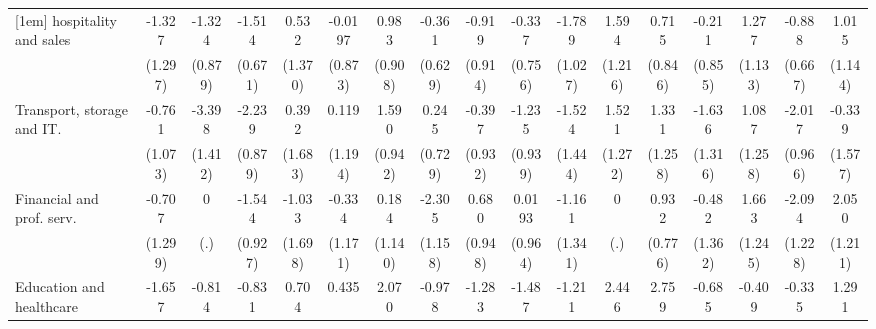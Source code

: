 {\begin{tabular}{l*{16}{c}}
[1em]
hospitality and sales&      -1.327         &      -1.324         &      -1.514\sym{*}  &       0.532         &     -0.0197         &       0.983         &      -0.361         &      -0.919         &      -0.337         &      -1.789         &       1.594         &       0.715         &      -0.211         &       1.277         &      -0.888         &       1.015         \\
                    &     (1.297)         &     (0.879)         &     (0.671)         &     (1.370)         &     (0.873)         &     (0.908)         &     (0.629)         &     (0.914)         &     (0.756)         &     (1.027)         &     (1.216)         &     (0.846)         &     (0.855)         &     (1.133)         &     (0.667)         &     (1.144)         \\
[1em]
Transport, storage and IT.&      -0.761         &      -3.398\sym{*}  &      -2.239\sym{*}  &       0.392         &       0.119         &       1.590         &       0.245         &      -0.397         &      -1.235         &      -1.524         &       1.521         &       1.331         &      -1.636         &       1.087         &      -2.017\sym{*}  &      -0.339         \\
                    &     (1.073)         &     (1.412)         &     (0.879)         &     (1.683)         &     (1.194)         &     (0.942)         &     (0.729)         &     (0.932)         &     (0.939)         &     (1.444)         &     (1.272)         &     (1.258)         &     (1.316)         &     (1.258)         &     (0.966)         &     (1.577)         \\
[1em]
Financial and prof. serv.&      -0.707         &           0         &      -1.544         &      -1.033         &      -0.334         &       0.184         &      -2.305\sym{*}  &       0.680         &      0.0193         &      -1.161         &           0         &       0.932         &      -0.482         &       1.663         &      -2.094         &       2.050         \\
                    &     (1.299)         &         (.)         &     (0.927)         &     (1.698)         &     (1.171)         &     (1.140)         &     (1.158)         &     (0.948)         &     (0.964)         &     (1.341)         &         (.)         &     (0.776)         &     (1.362)         &     (1.245)         &     (1.228)         &     (1.211)         \\
[1em]
Education and healthcare&      -1.657         &      -0.814         &      -0.831         &       0.704         &       0.435         &       2.070\sym{*}  &      -0.978         &      -1.283         &      -1.487         &      -1.211         &       2.446         &       2.759\sym{*}  &      -0.685         &      -0.409         &      -0.335         &       1.291         \\

\end{tabular}}
